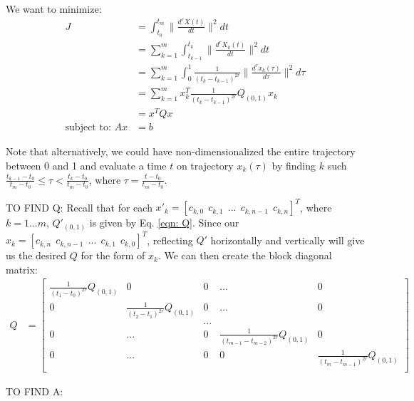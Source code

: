 \documentclass[11pt]{article}
\begin{document}
\mbox{} \newline
We want to minimize:
\begin{align*}
J &= \int_{t_0}^{t_m} \|  \frac{d^{r} X(t) }{dt} \|^2 dt \\
&= \sum_{k=1}^{m} \int_{t_{k-1}}^{t_k} \|  \frac{d^{r} X_k (t) }{dt} \|^2 dt  \\
&= \sum_{k=1}^{m} \int_{0}^{1} \frac{1}{(t_k-t_{k-1})^{2r}} \|  \frac{d^{r} x_k (\tau) }{d\tau} \|^2 d\tau  \\
&=  \sum_{k=1}^{m} x_k^T \frac{1}{(t_k-t_{k-1})^{2r}} Q_{(0, 1)} x_k \\
&= x^T Q x \\
\text{subject to: } A x &=b
\end{align*}

\mbox{} \newline
Note that alternatively, we could have non-dimensionalized the entire trajectory between 0 and 1 and evaluate a time $t$ on trajectory $x_k(\tau)$ by finding $k$ such $\frac{t_{k-1}-t_0}{t_m-t_0} \le \tau < \frac{t_{k}-t_0}{t_m-t_0}$, where $\tau = \frac{t-t_0}{t_m-t_0}$. 



\mbox{} \newline
\mbox{} \newline
TO FIND Q: \newline
Recall that for each $x'_k = [c_{k, 0} \ \ c_{k, 1} \ \ ... \ \ c_{k, n-1} \ \ c_{k, n}]^T$, where $k = 1...m$, $Q'_{(0, 1)}$ is given by Eq. \ref{eqn: Q}. Since our $x_k = [c_{k, n} \ \ c_{k, n-1} \ \ ... \ \ c_{k, 1} \ \ c_{k, 0}]^T$, reflecting $Q'$ horizontally and vertically will give us the desired $Q$ for the form of $x_k$. We can then create the block diagonal matrix:
\begin{align}
\label{eqn: Qkeyframes} Q &= 
\begin{bmatrix}
  \frac{1}{(t_1-t_{0})^{2r}} Q_{(0, 1)} & 0 & 0 & ... & 0 \\
  0 & \frac{1}{(t_2-t_{1})^{2r}} Q_{(0, 1)} & 0 & ... & 0 \\
  & & ... & &  \\
  0 & ... & 0 & \frac{1}{(t_{m-1}-t_{m-2})^{2r}} Q_{(0, 1)} & 0 \\
  0 & ... & 0 & 0 & \frac{1}{(t_m-t_{m-1})^{2r}} Q_{(0, 1)} \\ 
 \end{bmatrix}
\end{align}



\mbox{} \newline
\mbox{} \newline
TO FIND A: \newline
\end{document}
